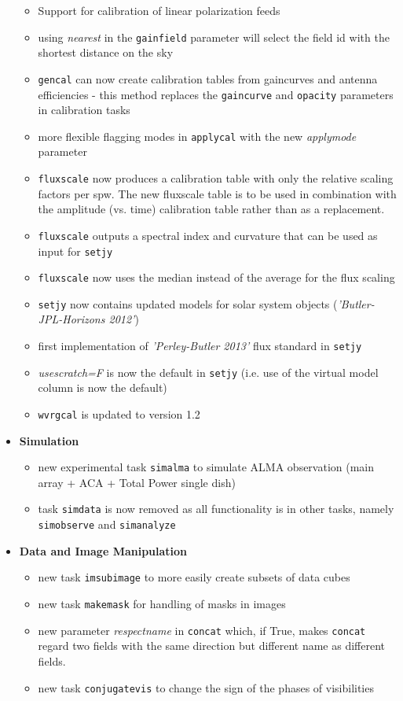 \begin{itemize}
\begin{itemize}
    \item  Support for calibration of linear polarization feeds 
    \item  using {\it nearest} in the {\tt gainfield} parameter will select the field id with the shortest distance on the sky
    \item {\tt gencal} can now create calibration tables from
      gaincurves and antenna efficiencies - this method replaces
      the {\tt gaincurve} and {\tt opacity} parameters in calibration tasks
   \item  more flexible flagging modes in {\tt applycal} with the new {\it applymode} parameter
   \item  {\tt fluxscale} now produces a calibration table with only the relative scaling factors per spw. The new fluxscale table is to be used in combination with the amplitude (vs. time) calibration table rather than as a replacement.
   \item  {\tt fluxscale} outputs a spectral index and curvature that can be used as input for {\tt setjy} 
   \item  {\tt fluxscale} now uses the median instead of the average for the flux scaling 
   \item  {\tt setjy} now contains updated models for solar system objects ({\it 'Butler-JPL-Horizons 2012'}) 
   \item  first implementation of {\it 'Perley-Butler 2013'} flux standard in {\tt setjy}
   \item  {\it usescratch=F} is now the default in {\tt setjy} (i.e. use of the virtual model column is now the default)
   \item  {\tt wvrgcal} is updated to version 1.2 
\end{itemize}

\item  {\bf Simulation}

\begin{itemize}

  \item  new experimental task {\tt simalma} to simulate ALMA observation (main array + ACA + Total Power single dish)
  \item  task {\tt simdata} is now removed as all functionality is in other tasks, namely {\tt simobserve} and {\tt simanalyze}


\end{itemize}


\item  {\bf Data and Image Manipulation} 
\begin{itemize}
   \item  new task {\tt imsubimage} to more easily create subsets of data cubes 
   \item  new task {\tt makemask} for handling of masks in images
   \item  new parameter {\it respectname} in {\tt concat} which, if True, makes {\tt concat} regard
        two fields with the same direction but different name as different fields.
    \item  new task {\tt conjugatevis} to change the sign of the phases of visibilities



\end{itemize}
\end{itemize}
